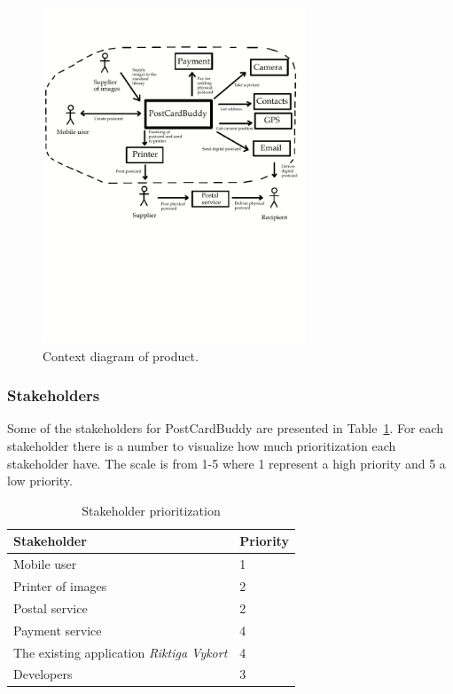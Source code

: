 \documentclass[10pt,a4paper]{article}
\begin{document}
\begin{figure}[h!]
\centering
\includegraphics[width=0.7\textwidth]{ContextDiagram3.pdf}
\caption{Context diagram of product.}
\label{fig:context}
\end{figure}

\subsubsection{Stakeholders}
Some of the stakeholders for PostCardBuddy are presented in Table~\ref{table:stakeholder}. For each stakeholder there is a number to visualize how much prioritization each stakeholder have. The scale is from 1-5 where 1 represent a high priority and 5 a low priority.


\begin{table}[h!]
\centering
\label{table:deliv}
\begin{tabular}{|l|l|} \hline
\textbf{Stakeholder} & \textbf{Priority} \\
\hline
Mobile user & 1\\
\hline
Printer of images & 2\\
\hline
Postal service & 2\\
\hline
Payment service & 4\\
\hline
The existing application \textit{Riktiga Vykort} & 4\\
\hline
Developers & 3\\
\hline
\end{tabular}\\
\caption{Stakeholder prioritization}
\label{table:stakeholder}
\end{table}
\end{document}
